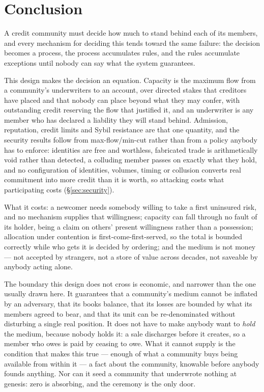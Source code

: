 \section{Conclusion}
\label{sec:conclusion}

A credit community must decide how much to stand behind each of its members, and every
mechanism for deciding this tends toward the same failure: the decision becomes a
process, the process accumulates rules, and the rules accumulate exceptions until nobody
can say what the system guarantees.

This design makes the decision an equation. Capacity is the maximum flow from a
community's underwriters to an account, over directed stakes that creditors have placed
and that nobody can place beyond what they may confer, with outstanding credit reserving
the flow that justified it, and an underwriter is any member who has declared a liability
they will stand behind. Admission, reputation, credit limits and Sybil resistance are that
one quantity, and the security results follow from max-flow/min-cut rather than from a
policy anybody has to enforce: identities are free and worthless, fabricated trade is
arithmetically void rather than detected, a colluding member passes on exactly what they
hold, and no configuration of identities, volumes, timing or collusion converts real
commitment into more credit than it is worth, so attacking costs what participating costs
(\S\ref{sec:security}).

What it costs: a newcomer needs somebody willing to take a first uninsured risk, and no
mechanism supplies that willingness; capacity can fall through no fault of its holder,
being a claim on others' present willingness rather than a possession; allocation under
contention is first-come-first-served, so the total is bounded correctly while who gets it
is decided by ordering; and the medium is not money --- not accepted by strangers, not a
store of value across decades, not saveable by anybody acting alone.

The boundary this design does not cross is economic, and narrower than the one usually
drawn here. It guarantees that a community's medium cannot be inflated by an adversary,
that its books balance, that its losses are bounded by what its members agreed to bear,
and that its unit can be re-denominated without disturbing a single real position. It does
not have to make anybody want to \emph{hold} the medium, because nobody holds it: a sale
discharges before it creates, so a member who owes is paid by ceasing to owe. What it
cannot supply is the condition that makes this true --- enough of what a community buys
being available from within it --- a fact about the community, knowable before anybody
founds anything. Nor can it seed a community that underwrote nothing at genesis: zero is
absorbing, and the ceremony is the only door.
